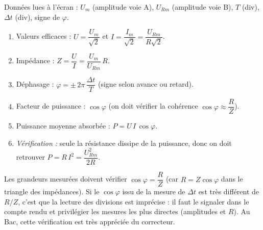 \documentclass[11pt]{article}
\begin{document}
\begin{methode}
Données lues à l'écran : $U_m$ (amplitude voie A), $U_{Rm}$ (amplitude voie B), $T$ (div), $\Delta t$ (div), signe de $\varphi$.
\begin{enumerate}
    \item Valeurs efficaces : $U = \dfrac{U_m}{\sqrt{2}}$ \quad et \quad $I = \dfrac{I_m}{\sqrt{2}} = \dfrac{U_{Rm}}{R\sqrt{2}}$.
    \item Impédance : $Z = \dfrac{U}{I} = \dfrac{U_m}{U_{Rm}}\,R$.
    \item Déphasage : $\varphi = \pm\,2\pi\,\dfrac{\Delta t}{T}$ (signe selon avance ou retard).
    \item Facteur de puissance : $\cos\varphi$ (on doit vérifier la cohérence $\cos\varphi \approx \dfrac{R}{Z}$).
    \item Puissance moyenne absorbée : $P = U\,I\,\cos\varphi$.
    \item \emph{Vérification :} seule la résistance dissipe de la puissance, donc on doit retrouver $P = R\,I^2 = \dfrac{U_{Rm}^2}{2R}$.
\end{enumerate}
\end{methode}

\begin{attention}
Les grandeurs mesurées doivent vérifier $\cos\varphi = \dfrac{R}{Z}$ (car $R = Z\cos\varphi$ dans le triangle des impédances). Si le $\cos\varphi$ issu de la mesure de $\Delta t$ est très différent de $R/Z$, c'est que la lecture des divisions est imprécise : il faut le signaler dans le compte rendu et privilégier les mesures les plus directes (amplitudes et $R$). Au Bac, cette vérification est très appréciée du correcteur.
\end{attention}
\end{document}
